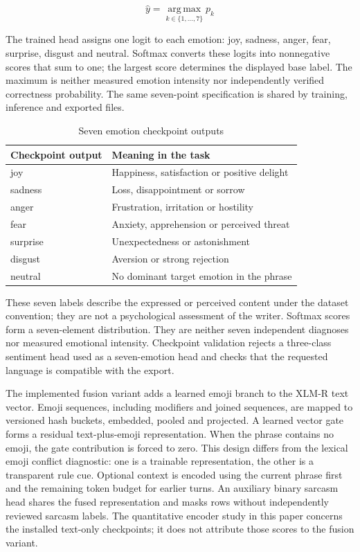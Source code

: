\documentclass[conference]{IEEEtran}
\begin{document}
\begin{equation}
\hat y=\operatorname*{arg\,max}_{k\in\{1,\ldots,7\}}p_k
\label{eq:argmax}
\end{equation}

The trained head assigns one logit to each emotion: joy, sadness, anger, fear, surprise, disgust and neutral. Softmax converts these logits into nonnegative scores that sum to one; the largest score determines the displayed base label. The maximum is neither measured emotion intensity nor independently verified correctness probability. The same seven-point specification is shared by training, inference and exported files.

\begin{table}[!t]
\caption{Seven emotion checkpoint outputs}
\centering
\footnotesize
\begin{tabularx}{\columnwidth}{@{}>{\raggedright\arraybackslash}X>{\raggedright\arraybackslash}X@{}}
\toprule
\textbf{Checkpoint output} & \textbf{Meaning in the task} \\
\midrule
joy & Happiness, satisfaction or positive delight \\
sadness & Loss, disappointment or sorrow \\
anger & Frustration, irritation or hostility \\
fear & Anxiety, apprehension or perceived threat \\
surprise & Unexpectedness or astonishment \\
disgust & Aversion or strong rejection \\
neutral & No dominant target emotion in the phrase \\
\bottomrule
\end{tabularx}
\end{table}


These seven labels describe the expressed or perceived content under the dataset convention; they are not a psychological assessment of the writer. Softmax scores form a seven-element distribution. They are neither seven independent diagnoses nor measured emotional intensity. Checkpoint validation rejects a three-class sentiment head used as a seven-emotion head and checks that the requested language is compatible with the export.

The implemented fusion variant adds a learned emoji branch to the XLM-R text vector. Emoji sequences, including modifiers and joined sequences, are mapped to versioned hash buckets, embedded, pooled and projected. A learned vector gate forms a residual text-plus-emoji representation. When the phrase contains no emoji, the gate contribution is forced to zero. This design differs from the lexical emoji conflict diagnostic: one is a trainable representation, the other is a transparent rule cue. Optional context is encoded using the current phrase first and the remaining token budget for earlier turns. An auxiliary binary sarcasm head shares the fused representation and masks rows without independently reviewed sarcasm labels. The quantitative encoder study in this paper concerns the installed text-only checkpoints; it does not attribute those scores to the fusion variant.
\end{document}

